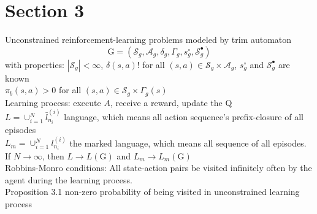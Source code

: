 \documentclass{article}
\begin{document}
\section{Section 3}
Unconstrained reinforcement-learning problems modeled by trim automaton$$
\mathrm{G}=(\mathcal{S}_g,\mathcal{A}_g,\delta_g,\Gamma_g,s_g^\circ,\mathcal{S}_g^\bullet)
$$
with properties: $|\mathcal{S}_g|<\infty$, $\delta(s,a)!$ for all $(s,a)\in\mathcal{S}_g\times \mathcal{A}_g$, $s_g^{\circ}$ and $\mathcal{S}_g^{\bullet}$ are known\\
$\pi_b(s,a)>0$ for all $(s,a)\in \mathcal{S}_g \times \Gamma_{g}(s)$\\
Learning process: execute $A$, receive a reward, update the Q\\
$L=\cup_{i=1}^N\bar{l}_{n_i}^{(i)}$ \quad language, which means all action sequence's prefix-closure of all episodes\\
$L_m=\cup_{i=1}^N {l}_{n_i}^{(i)}$ \quad the marked language, which means all sequence of all episodes.\\
If $N \rightarrow \infty$, then $L \rightarrow L(\mathrm{G})$ and $L_m \rightarrow L_m(\mathrm{G})$\\
Robbins-Monro conditions: All state-action pairs be visited infinitely often by the agent during the learning process.\\
Proposition 3.1 non-zero probability of being visited in unconstrained learning process\\
\end{document}
